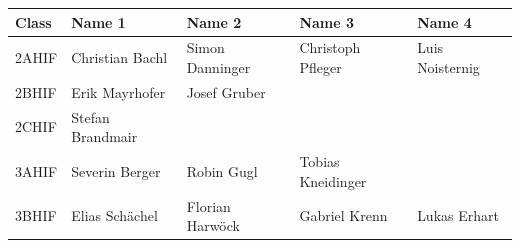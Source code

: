 \documentclass[11pt]{article}
\begin{document}
\begin{tabular}{|l|l|l|l|l|}
\hline
	Class & Name 1 & Name 2 & Name 3 & Name 4 \\
	\hline
	2AHIF & Christian Bachl & Simon Danninger & Christoph Pfleger & Luis Noisternig \\
	\hline
	2BHIF & Erik Mayrhofer & Josef Gruber &&\\
	\hline
	2CHIF & Stefan Brandmair &&&\\
	\hline
	3AHIF & Severin Berger & Robin Gugl & Tobias Kneidinger &\\
	\hline
	3BHIF & Elias Schächel & Florian Harwöck & Gabriel Krenn & Lukas Erhart \\
	\hline
\end{tabular}
\end{document}
